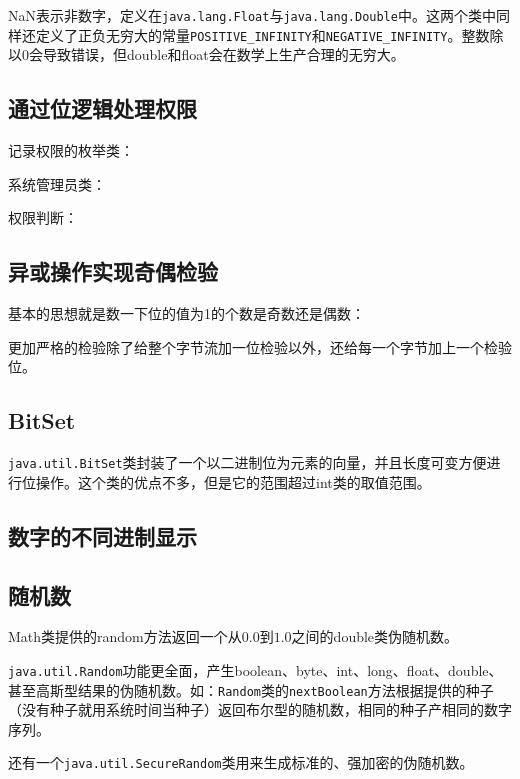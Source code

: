 NaN表示非数字，定义在\verb|java.lang.Float|与\verb|java.lang.Double|中。这两个类中同样还定义了正负无穷大的常量\verb|POSITIVE_INFINITY|和\verb|NEGATIVE_INFINITY|。整数除以0会导致错误，但double和float会在数学上生产合理的无穷大。





\subsection{通过位逻辑处理权限}

记录权限的枚举类：



系统管理员类：



权限判断：





\subsection{异或操作实现奇偶检验}

基本的思想就是数一下位的值为1的个数是奇数还是偶数：



更加严格的检验除了给整个字节流加一位检验以外，还给每一个字节加上一个检验位。



\subsection{BitSet}

\verb|java.util.BitSet|类封装了一个以二进制位为元素的向量，并且长度可变方便进行位操作。这个类的优点不多，但是它的范围超过int类的取值范围。



\subsection{数字的不同进制显示}





\subsection{随机数}

Math类提供的random方法返回一个从$0.0$到$1.0$之间的double类伪随机数。

\verb|java.util.Random|功能更全面，产生boolean、byte、int、long、float、double、甚至高斯型结果的伪随机数。如：\verb|Random|类的\verb|nextBoolean|方法根据提供的种子（没有种子就用系统时间当种子）返回布尔型的随机数，相同的种子产相同的数字序列。

还有一个\verb|java.util.SecureRandom|类用来生成标准的、强加密的伪随机数。







